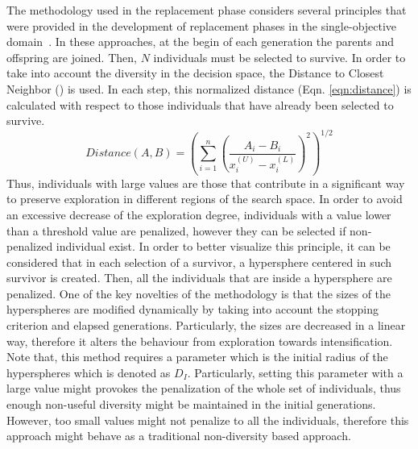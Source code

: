 The methodology used in the replacement phase considers several principles that were provided in the 
development of replacement phases in the single-objective domain~\cite{Joel:MULTI_DYNAMIC}.
%
%
In these approaches, at the begin of each generation the parents and offspring are joined.
%
Then, $N$ individuals must be selected to survive.
%
In order to take into account the diversity in the decision space, the 
Distance to Closest Neighbor (\DCN{}) is used.
%
In each step, this normalized distance (Eqn. \ref{eqn:distance}) is calculated with respect to those individuals that have already been selected to survive.
%
\begin{equation}\label{eqn:distance}
Distance(A, B) = \left (\sum_{i=1}^n \left ( \frac{A_i - B_i}{x_i^{(U)} - x_i^{(L)}} \right )^2  \right)^{1/2}
\end{equation}
Thus, individuals with large \DCN{} values are those that contribute in a significant way to preserve exploration in different regions of the search space.
%
In order to avoid an excessive decrease of the exploration degree, individuals with a \DCN{} value lower than a threshold value are penalized, however they can be selected if non-penalized individual exist.
%
In order to better visualize this principle, it can be considered that in each selection of a survivor, a hypersphere centered in such survivor is created.
%
Then, all the individuals that are inside a hypersphere are penalized.
%
One of the key novelties of the methodology is that the sizes of the hyperspheres are modified dynamically by taking into account the stopping criterion
and elapsed generations.
%
Particularly, the sizes are decreased in a linear way, therefore it alters the behaviour from exploration towards intensification.
%
Note that, this method requires a parameter which is the initial radius of the hyperspheres which is denoted as $D_I$. 
%
Particularly, setting this parameter with a large value might provokes the penalization of the whole set of individuals, thus enough non-useful diversity might be maintained in the initial generations.
%
However, too small values might not penalize to all the individuals, therefore this approach might behave as a traditional non-diversity based approach.

